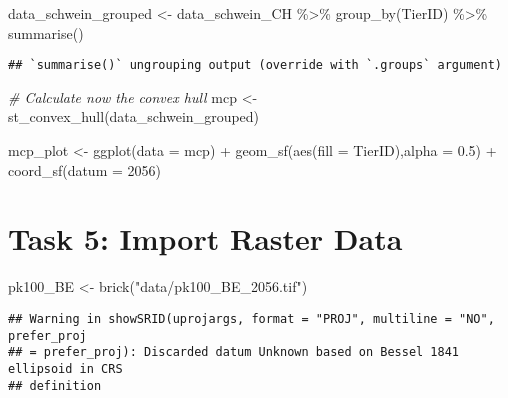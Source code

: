 \documentclass[
]{book}
\newenvironment{Shaded}{\begin{snugshade}}{\end{snugshade}}
\newcommand{\AttributeTok}[1]{\textcolor[rgb]{0.77,0.63,0.00}{#1}}
\newcommand{\CommentTok}[1]{\textcolor[rgb]{0.56,0.35,0.01}{\textit{#1}}}
\newcommand{\DecValTok}[1]{\textcolor[rgb]{0.00,0.00,0.81}{#1}}
\newcommand{\FloatTok}[1]{\textcolor[rgb]{0.00,0.00,0.81}{#1}}
\newcommand{\FunctionTok}[1]{\textcolor[rgb]{0.00,0.00,0.00}{#1}}
\newcommand{\NormalTok}[1]{#1}
\newcommand{\OtherTok}[1]{\textcolor[rgb]{0.56,0.35,0.01}{#1}}
\newcommand{\SpecialCharTok}[1]{\textcolor[rgb]{0.00,0.00,0.00}{#1}}
\newcommand{\StringTok}[1]{\textcolor[rgb]{0.31,0.60,0.02}{#1}}
\begin{document}
\begin{Shaded}
\begin{Highlighting}[]
\NormalTok{data\_schwein\_grouped }\OtherTok{\textless{}{-}}\NormalTok{ data\_schwein\_CH }\SpecialCharTok{\%\textgreater{}\%}
  \FunctionTok{group\_by}\NormalTok{(TierID) }\SpecialCharTok{\%\textgreater{}\%}
  \FunctionTok{summarise}\NormalTok{()}
\end{Highlighting}
\end{Shaded}

\begin{verbatim}
## `summarise()` ungrouping output (override with `.groups` argument)
\end{verbatim}

\begin{Shaded}
\begin{Highlighting}[]
\CommentTok{\# Calculate now the convex hull}
\NormalTok{mcp }\OtherTok{\textless{}{-}} \FunctionTok{st\_convex\_hull}\NormalTok{(data\_schwein\_grouped)}
\end{Highlighting}
\end{Shaded}

\begin{Shaded}
\begin{Highlighting}[]
\NormalTok{mcp\_plot }\OtherTok{\textless{}{-}} \FunctionTok{ggplot}\NormalTok{(}\AttributeTok{data =}\NormalTok{ mcp) }\SpecialCharTok{+}
  \FunctionTok{geom\_sf}\NormalTok{(}\FunctionTok{aes}\NormalTok{(}\AttributeTok{fill =}\NormalTok{ TierID),}\AttributeTok{alpha =} \FloatTok{0.5}\NormalTok{) }\SpecialCharTok{+} \FunctionTok{coord\_sf}\NormalTok{(}\AttributeTok{datum =} \DecValTok{2056}\NormalTok{)}
\end{Highlighting}
\end{Shaded}

\hypertarget{task-5-import-raster-data}{%
\section{Task 5: Import Raster Data}\label{task-5-import-raster-data}}

\begin{Shaded}
\begin{Highlighting}[]
\NormalTok{pk100\_BE }\OtherTok{\textless{}{-}} \FunctionTok{brick}\NormalTok{(}\StringTok{"data/pk100\_BE\_2056.tif"}\NormalTok{)}
\end{Highlighting}
\end{Shaded}

\begin{verbatim}
## Warning in showSRID(uprojargs, format = "PROJ", multiline = "NO", prefer_proj
## = prefer_proj): Discarded datum Unknown based on Bessel 1841 ellipsoid in CRS
## definition
\end{verbatim}
\end{document}
